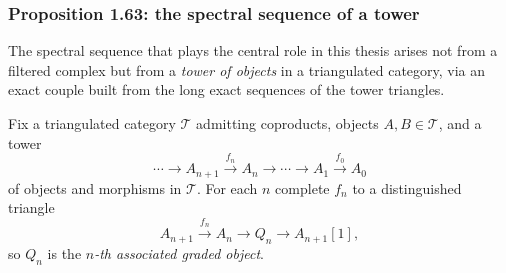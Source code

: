 \documentclass[12pt,a4paper]{article}
\theoremstyle{definition}
\begin{document}
\subsubsection{Proposition 1.63: the spectral sequence of a tower}
\label{subsubsec:tower-SS}

The spectral sequence that plays the central role in this thesis arises not from a
filtered complex but from a \emph{tower of objects} in a triangulated category,
via an exact couple built from the long exact sequences of the tower triangles.

Fix a triangulated category $\mathcal{T}$ admitting coproducts, objects
$A,B\in\mathcal{T}$, and a tower
\begin{equation}\label{eq:tower}
  \cdots\longrightarrow A_{n+1}\xrightarrow{f_n} A_n\longrightarrow\cdots
  \longrightarrow A_1\xrightarrow{f_0} A_0
\end{equation}
of objects and morphisms in $\mathcal{T}$.  For each $n$ complete $f_n$ to a
distinguished triangle
\[
  A_{n+1}\xrightarrow{f_n} A_n\longrightarrow Q_n\longrightarrow A_{n+1}[1],
\]
so $Q_n$ is the \emph{$n$-th associated graded object}.
\end{document}
